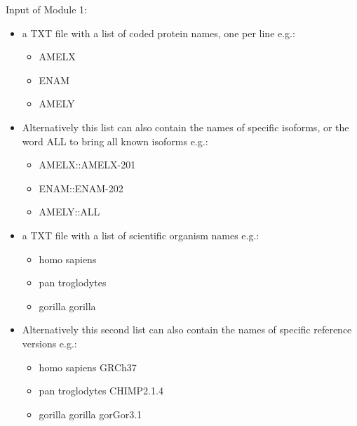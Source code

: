 \documentclass{book}
\begin{document}
{\large Input of Module 1:}
\begin{itemize}
\item a TXT file with a list of coded protein names, one per line e.g.:
\begin{itemize}
\item[] AMELX
\item[] ENAM
\item[] AMELY
\end{itemize}

\item Alternatively this list can also contain the names of specific isoforms, or the word ALL to bring all known isoforms e.g.:

\begin{itemize}
\item[] AMELX::AMELX-201
\item[] ENAM::ENAM-202
\item[] AMELY::ALL
\end{itemize}


\item a TXT file with a list of scientific organism names e.g.:
\begin{itemize}
\item[] homo sapiens
\item[] pan troglodytes
\item[] gorilla gorilla
\end{itemize}


\item Alternatively this second list can also contain the names of specific reference versions e.g.:
\begin{itemize}
\item[] homo sapiens \quad GRCh37
\item[] pan troglodytes \quad  CHIMP2.1.4
\item[] gorilla gorilla \quad gorGor3.1
\end{itemize}

\end{itemize}
	 

\vspace{2cm}




	
	
	
	
	
	
	
	
	
	
	
\end{document}
